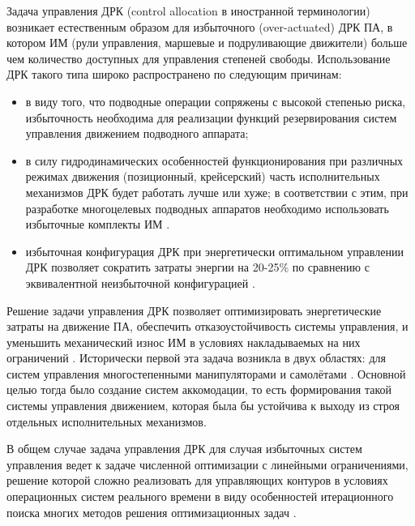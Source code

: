 {\actuality}
Задача управления ДРК (control allocation в иностранной терминологии) возникает естественным образом для избыточного (over-actuated) ДРК ПА, в котором ИМ (рули управления, маршевые и подруливающие движители) больше чем количество доступных для управления степеней свободы. Использование ДРК такого типа широко распространено по следующим причинам:

\begin{itemize}
    \item в виду того, что подводные операции сопряжены с высокой степенью риска, избыточность необходима для реализации функций резервирования систем управления движением подводного аппарата;
    \item в силу гидродинамических особенностей функционирования при различных режимах движения (позиционный, крейсерский) часть исполнительных механизмов ДРК будет работать лучше или хуже; в соответствии с этим, при разработке многоцелевых подводных аппаратов необходимо использовать избыточные комплекты ИМ \cite{valasek2002design}.
    \item избыточная конфигурация ДРК при энергетически оптимальном управлении ДРК позволяет сократить затраты энергии на 20-25\% по сравнению с эквивалентной неизбыточной конфигурацией \cite{бриллиантов2005разработка}.
\end{itemize}

Решение задачи управления ДРК позволяет оптимизировать энергетические затраты на движение ПА, обеспечить отказоустойчивость системы управления, и уменьшить механический износ ИМ в условиях накладываемых на них ограничений \cite{enns1998control}.
Исторически первой эта задача возникла в двух областях: для систем управления многостепенными манипуляторами \cite{craig2009introduction} и самолётами \cite{bordignon1996constrained}. 
Основной целью тогда было создание систем аккомодации, то есть формирования такой системы управления движением, которая была бы устойчива к выходу из строя отдельных исполнительных механизмов.

В общем случае задача управления ДРК для случая избыточных систем управления ведет к задаче численной оптимизации с линейными ограничениями, решение которой сложно реализовать для управляющих контуров в условиях операционных систем реального времени в виду особенностей итерационного поиска многих методов решения оптимизационных задач \cite{burken2001two}.

